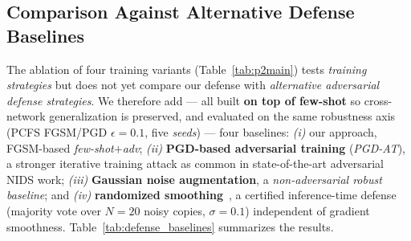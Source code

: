 \documentclass[preprint,12pt,authoryear]{elsarticle}
\begin{document}
\subsection{Comparison Against Alternative Defense Baselines}
\label{sec:baselines}
The ablation of four training variants (Table~\ref{tab:p2main}) tests \emph{training
strategies} but does not yet compare our defense with \emph{alternative adversarial
defense strategies}. We therefore add --- all built \textbf{on top of few-shot} so
cross-network generalization is preserved, and evaluated on the same robustness axis
(PCFS FGSM/PGD $\epsilon{=}0.1$, five \emph{seeds}) --- four baselines: \emph{(i)}
our approach, FGSM-based \emph{few-shot$+$adv}; \emph{(ii)} \textbf{PGD-based
adversarial training} (\emph{PGD-AT}), a stronger iterative training attack as
common in state-of-the-art adversarial NIDS work; \emph{(iii)} \textbf{Gaussian
noise augmentation}, a \emph{non-adversarial robust baseline}; and \emph{(iv)}
\textbf{randomized smoothing}~\citep{cohen2019smoothing}, a certified inference-time
defense (majority vote over $N{=}20$ noisy copies, $\sigma{=}0.1$) independent of
gradient smoothness. Table~\ref{tab:defense_baselines} summarizes the results.
\end{document}
